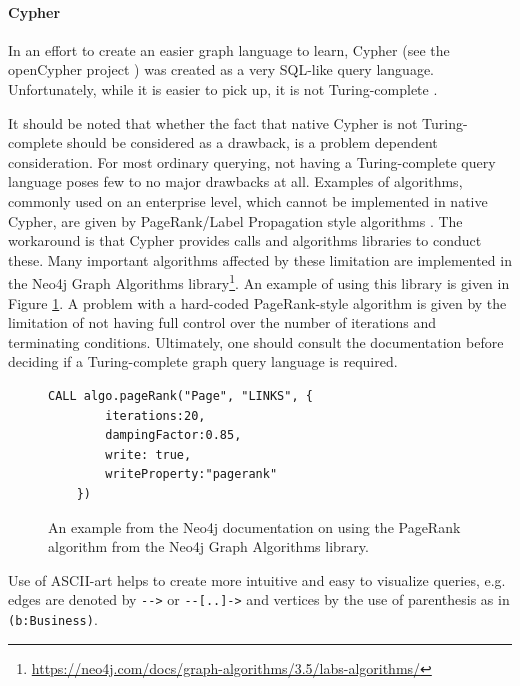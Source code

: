 \paragraph{Cypher}

In an effort to create an easier graph language to learn, Cypher (see the openCypher project \cite{opencypher}) was created as a very SQL-like query language. Unfortunately, while it is easier to pick up, it is not Turing-complete \cite{modern-graph-query-lang}.

It should be noted that whether the fact that native Cypher is not Turing-complete should be considered as a drawback, is a problem dependent consideration. For most ordinary querying, not having a Turing-complete query language poses few to no major drawbacks at all. Examples of algorithms, commonly used on an enterprise level, which cannot be implemented in native Cypher, are given by PageRank/Label Propagation style algorithms \cite{modern-graph-query-lang}. The workaround is that Cypher provides calls and algorithms libraries to conduct these. Many important algorithms affected by these limitation are implemented in the Neo4j Graph Algorithms library\footnote{\url{https://neo4j.com/docs/graph-algorithms/3.5/labs-algorithms/}}. An example of using this library is given in Figure \ref{lst:cypher-pagerank}. A problem with a hard-coded PageRank-style algorithm is given by the limitation of not having full control over the number of iterations and terminating conditions. Ultimately, one should consult the documentation before deciding if a Turing-complete graph query language is required.

\begin{figure}[h]
    \centering
    \begin{lstlisting}[language=cypher]
    CALL algo.pageRank("Page", "LINKS", {
        iterations:20,
        dampingFactor:0.85,
        write: true,
        writeProperty:"pagerank"
    })
    \end{lstlisting}
    \caption{An example from the Neo4j documentation \cite{neo4jpagerank} on using the PageRank algorithm from the Neo4j Graph Algorithms library.}
    \label{lst:cypher-pagerank}
\end{figure}

Use of ASCII-art helps to create more intuitive and easy to visualize queries, e.g. edges are denoted by \verb|-->| or \verb|--[..]->| and vertices by the use of parenthesis as in \verb|(b:Business)|.

